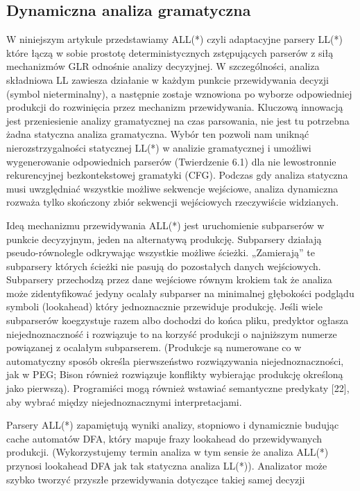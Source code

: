 \subsection{Dynamiczna analiza gramatyczna}
W niniejszym artykule przedstawiamy ALL(*) czyli adaptacyjne parsery LL(*)
które łączą w sobie prostotę deterministycznych zstępujących parserów z
siłą mechanizmów GLR odnośnie analizy decyzyjnej.
W szczególności, analiza składniowa LL zawiesza działanie w każdym punkcie
przewidywania decyzji (symbol nieterminalny), a następnie zostaje wznowiona
po wyborze odpowiedniej produkcji do rozwinięcia przez mechanizm przewidywania.
Kluczową innowacją jest przeniesienie analizy gramatycznej na czas parsowania,
nie jest tu potrzebna żadna statyczna analiza gramatyczna.
Wybór ten pozwoli nam uniknąć nierozstrzygalności statycznej LL(*) w analizie
gramatycznej i umożliwi wygenerowanie odpowiednich parserów (Twierdzenie 6.1)
dla nie lewostronnie rekurencyjnej bezkontekstowej gramatyki (CFG).
Podczas gdy analiza statyczna musi uwzględniać wszystkie możliwe sekwencje
wejściowe, analiza dynamiczna rozważa tylko skończony zbiór sekwencji
wejściowych rzeczywiście widzianych.
\par
Ideą mechanizmu przewidywania ALL(*) jest uruchomienie subparserów w punkcie
decyzyjnym, jeden na alternatywą produkcję.
Subparsery działają pseudo-równolegle odkrywając wszystkie możliwe ścieżki.
„Zamierają” te subparsery których ścieżki nie pasują do pozostałych
danych wejściowych.
Subparsery przechodzą przez dane wejściowe równym krokiem tak że analiza może
zidentyfikować jedyny ocalały subparser na minimalnej głębokości podglądu
symboli (lookahead) który jednoznacznie przewiduje produkcję.
Jeśli wiele subparserów koegzystuje razem albo dochodzi do końca pliku, predyktor
ogłasza niejednoznaczność i rozwiązuje to na korzyść produkcji o najniższym
numerze powiązanej z ocalałym subparserem.
(Produkcje są numerowane co w automatyczny sposób określa pierwszeństwo
rozwiązywania niejednoznaczności, jak w  PEG; Bison również rozwiązuje konflikty
wybierając produkcję określoną jako pierwszą).
Programiści mogą również wstawiać semantyczne predykaty [22], aby wybrać
między niejednoznacznymi interpretacjami.
\par
Parsery ALL(*) zapamiętują wyniki analizy, stopniowo i dynamicznie budując
cache automatów DFA, który mapuje frazy lookahead do przewidywanych produkcji.
(Wykorzystujemy termin analiza w tym sensie że analiza ALL(*) przynosi
lookahead DFA jak tak statyczna analiza LL(*)).
Analizator może szybko tworzyć przyszłe przewidywania dotyczące takiej samej decyzji
